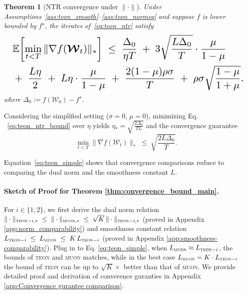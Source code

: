 \documentclass{article}
\newcommand{\ten}[1]{\bm{\mathcal{#1}}}
\theoremstyle{plain}
\newtheorem{theorem}{Theorem}[section]
\theoremstyle{definition}
\theoremstyle{remark}
\begin{document}
\begin{theorem}[NTR convergence under $\|\cdot\|$]

\label{thm:teon_ntr_full}
Under Assumptions~\ref{ass:teon_smooth}--\ref{ass:teon_normeq} and suppose $f$ is lower bounded by $f^\star$,
the iterates of~\eqref{eq:teon_ntr} satisfy
\begin{equation}
\label{eq:teon_ntr_bound}
\resizebox{\columnwidth}{!}{$
\begin{aligned}
&\ \mathbb{E}\!\left[\min_{t<T}\|\nabla f(\ten{W}_t)\|_{*}\right]
\;\le\;
\frac{\Delta_0}{\eta T}
\;+\;
3\sqrt{\frac{L\Delta_0}{T}}\cdot\frac{\mu}{1-\mu}
\\
&\ +\;
\frac{L\eta}{2}
\;+\;
L\eta\cdot\frac{\mu}{1-\mu}
\;+\;
\frac{2(1-\mu)\rho\sigma}{T}
\; +\;
\rho\sigma\sqrt{\frac{1-\mu}{1+\mu}} .
\end{aligned}
$}
\end{equation}
where $\Delta_0:=f(\ten{W}_0)-f^\star$.
\end{theorem}


Considering the simplified setting ($\sigma=0$, $\mu=0$), minimizing Eq. ~\eqref{eq:teon_ntr_bound}  over $\eta$ yields $\eta_{*}=\sqrt{\frac{2\Delta_0}{T L}}$ and the convergence guarantee
\begin{equation}
\label{eq:teon_simple}
\min_{t<T}\|\nabla f(\ten{W}_t)\|_{*}
\;\le\;
\sqrt{\frac{2L\Delta_0}{T}}.
\end{equation}

Equation~\eqref{eq:teon_simple} shows that convergence comparisons reduce to comparing the dual norm and the smoothness constant $L$. 

\paragraph{Sketch of Proof for Theorem \ref{thm:convergence_bound_main}.}
For $i\in\{1,2\}$,
we first derive the dual norm relation 
$
\|\cdot\|_{\textsc{teon}-i,*}
\;\le\;
\|\cdot\|_{\textsc{muon},*}
\;\le\;
\sqrt{K}\,\|\cdot\|_{\textsc{teon}-i,*}
$
(proved in Appendix \ref{app:norm_comparability})
and smoothness constant relation
$
L_{\textsc{teon}-i}
\;\le\;
L_{\textsc{muon}}
\;\le\;
K\,L_{\textsc{teon}-i}
$
(proved in Appendix \ref{app:smoothness-comparability}). Plug in to Eq. \eqref{eq:teon_simple}, when $L_{\textsc{muon}}\approx L_{\textsc{teon}-i}$, the bounds of \textsc{teon} and \textsc{muon} matches, while in the best case $L_{\textsc{muon}}= K\cdot  L_{\textsc{teon}-i}$ the bound of \textsc{teon} can be up to $\sqrt{K}\times $ better than that of \textsc{muon}. We provide detailed proof and derivation of converence guranties in Appendix \ref{app:Convergence gurantee comparison}.
\end{document}

